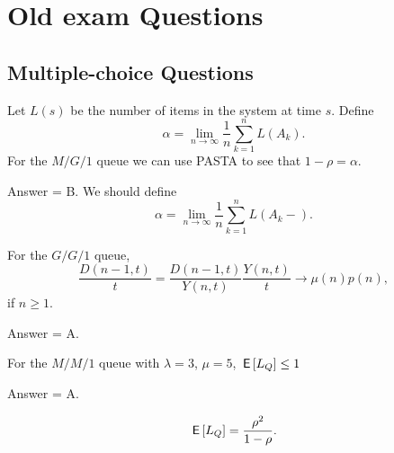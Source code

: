 \section{Old exam Questions}

\subsection{Multiple-choice Questions}

\begin{exercise}[201703]
Let $L(s)$ be the number of items in the system at time $s$. 
Define 
\begin{equation*}
\alpha = \lim_{n\to\infty} \frac 1 n \sum_{k=1}^n L(A_k).
\end{equation*}
For the $M/G/1$ queue we can use PASTA to see  that $1-\rho = \alpha$.

\begin{solution} Answer = B.
We should define
\begin{equation*}
\alpha = \lim_{n\to\infty} \frac 1 n \sum_{k=1}^n L(A_k-).
\end{equation*}
\end{solution}
\end{exercise}

\begin{exercise}[201703]
For the $G/G/1$ queue,
\begin{equation}
  \frac{D(n-1,t)}t =   \frac{D(n-1,t)}{Y(n,t)}\frac{Y(n,t)}t \to \mu(n) p(n),
\end{equation}
if $n\geq 1$.

\begin{solution}
    Answer = A.
\end{solution}
\end{exercise}

\begin{exercise}[201703]
  For the $M/M/1$ queue with $\lambda=3$, $\mu=5$, $\,\mathsf{E}\left[L_Q\right] \leq 1$

\begin{solution}
    Answer = A.

    \begin{equation*}
\,\mathsf{E}\left[L_Q\right] = \frac{\rho^2}{1-\rho}.
    \end{equation*}
\end{solution}
\end{exercise}

